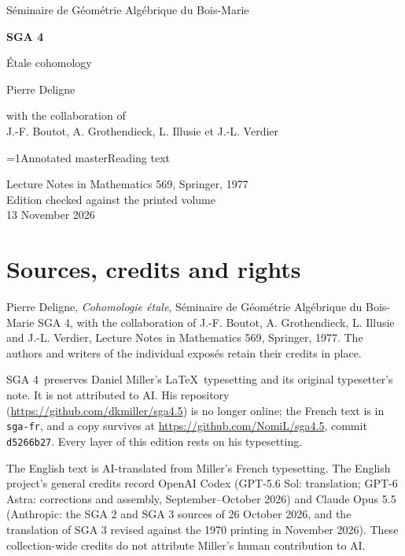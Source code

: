 \documentclass[oneside]{book}
\theoremstyle{sga-source}
\theoremstyle{sga-source-dash}
\theoremstyle{sga-source-dotdash}
\theoremstyle{sga-source-number-note-dash}
\theoremstyle{sga-source-note-number-dotdash}
\theoremstyle{sga-source-example-dotdash}
\theoremstyle{sga-source-inline-number}
\theoremstyle{sga-source-bare-number}
\theoremstyle{sga-source}
\providecommand\EditionIsMaster{1}
\begin{document}
\begin{titlepage}
\centering
\vspace*{2cm}
{\Large Séminaire de Géométrie Algébrique du Bois-Marie\par}
\vspace{0.7cm}
{\Huge\bfseries SGA 4\textonehalf\par}
\vspace{0.8cm}
{\huge Étale cohomology\par}
\vspace{1cm}
{\Large Pierre Deligne\par}
\vspace{0.5cm}
with the collaboration of\\[0.3em]
J.-F. Boutot, A. Grothendieck, L. Illusie et J.-L. Verdier
\vfill
{\Large \ifnum\EditionIsMaster=1\relax Annotated master\else Reading text\fi\par}
\vspace{0.7cm}
Lecture Notes in Mathematics 569, Springer, 1977\\[0.4em]
Edition checked against the printed volume\\
13 November 2026
\end{titlepage}

\chapter*{Sources, credits and rights}
Pierre Deligne, \emph{Cohomologie étale}, Séminaire de Géométrie Algébrique
du Bois-Marie SGA 4\textonehalf, with the collaboration of J.-F. Boutot,
A. Grothendieck, L. Illusie and J.-L. Verdier, Lecture Notes in Mathematics
569, Springer, 1977. The authors and writers of the individual exposés
retain their credits in place.

\medskip
SGA 4\textonehalf\ preserves Daniel Miller’s \LaTeX\ typesetting and its
original typesetter’s note. It is not attributed to AI. His repository
(\url{https://github.com/dkmiller/sga4.5}) is no longer online; the French
text is in \texttt{sga-fr}, and a copy survives at
\url{https://github.com/NomiL/sga4.5}, commit \texttt{d5266b27}.
Every layer of this edition rests on his typesetting.

\medskip
The English text is AI-translated from Miller’s French typesetting.
The English project’s general credits record OpenAI Codex (GPT-5.6 Sol:
translation; GPT-6 Astra: corrections and assembly, September--October
2026) and Claude Opus 5.5 (Anthropic: the SGA 2 and SGA 3 sources of
26 October 2026, and the translation of SGA 3 revised against the 1970
printing in November 2026). These collection-wide credits do not attribute
Miller’s human contribution to AI.
\end{document}
